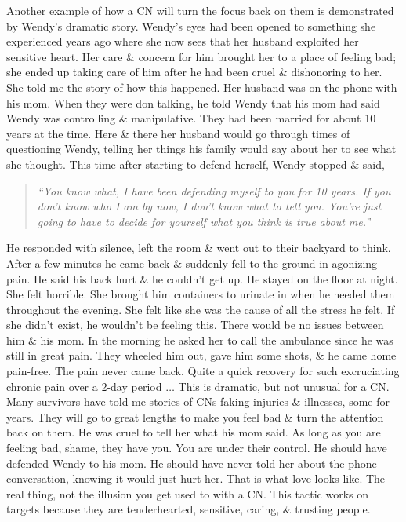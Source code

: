 \documentclass{article}
\numberwithin{equation}{section}
\begin{document}
Another example of how a CN will turn the focus back on them is demonstrated by Wendy's dramatic story. Wendy's eyes had been opened to something she experienced years ago where she now sees that her husband exploited her sensitive heart. Her care \& concern for him brought her to a place of feeling bad; she ended up taking care of him after he had been cruel \& dishonoring to her. She told me the story of how this happened. Her husband was on the phone with his mom. When they were don talking, he told Wendy that his mom had said Wendy was controlling \& manipulative. They had been married for about 10 years at the time. Here \& there her husband would go through times of questioning Wendy, telling her things his family would say about her to see what she thought. This time after starting to defend herself, Wendy stopped \& said,
\begin{quotation}\it
	``You know what, I have been defending myself to you for 10 years. If you don't know who I am by now, I don't know what to tell you. You're just going to have to decide for yourself what you think is true about me.''
\end{quotation}
He responded with silence, left the room \& went out to their backyard to think. After a few minutes he came back \& suddenly fell to the ground in agonizing pain. He said his back hurt \& he couldn't get up. He stayed on the floor at night. She felt horrible. She brought him containers to urinate in when he needed them throughout the evening. She felt like she was the cause of all the stress he felt. If she didn't exist, he wouldn't be feeling this. There would be no issues between him \& his mom. In the morning he asked her to call the ambulance since he was still in great pain. They wheeled him out, gave him some shots, \& he came home pain-free. The pain never came back. Quite a quick recovery for such excruciating chronic pain over a 2-day period $\ldots$ This is dramatic, but not unusual for a CN. Many survivors have told me stories of CNs faking injuries \& illnesses, some for years. They will go to great lengths to make you feel bad \& turn the attention back on them. He was cruel to tell her what his mom said. As long as you are feeling bad, shame, they have you. You are under their control. He should have defended Wendy to his mom. He should have never told her about the phone conversation, knowing it would just hurt her. That is what love looks like. The real thing, not the illusion you get used to with a CN. This tactic works on targets because they are tenderhearted, sensitive, caring, \& trusting people.
\end{document}
